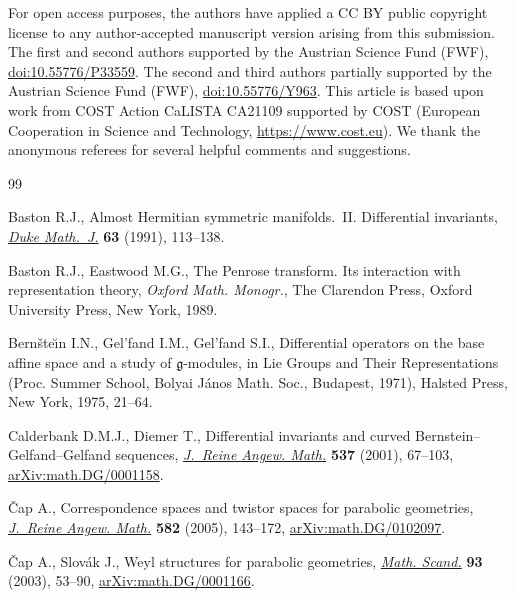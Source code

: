 \documentclass[pdftex]{sigma}
\numberwithin{equation}{section}
\begin{document}
For open access purposes, the authors have applied a CC
BY public copyright license to any author-accepted manuscript version arising from
this submission. The first and second authors supported by the Austrian Science Fund (FWF), \href{https://doi.org/10.55776/P33559}{doi:10.55776/P33559}. The second and third authors partially supported by the Austrian Science
Fund (FWF), \href{https://doi.org/10.55776/Y963}{doi:10.55776/Y963}. This article is based upon work from COST Action CaLISTA CA21109
supported by COST (European Cooperation in Science and
Technology, \url{https://www.cost.eu}).
We thank the anonymous referees for several helpful comments and suggestions.


\begin{thebibliography}{99}
\footnotesize\itemsep=0pt

Baston R.J., Almost {H}ermitian symmetric manifolds.~{II}. {D}ifferential
 invariants, \href{https://doi.org/10.1215/S0012-7094-91-06306-4}{\textit{Duke Math.~J.}} \textbf{63} (1991), 113--138.

Baston R.J., Eastwood M.G., The {P}enrose transform. Its interaction with
 representation theory, \textit{Oxford Math. Monogr.}, The Clarendon Press, Oxford
 University Press, New York, 1989.

Bern\v{s}te\u{\i}n I.N., Gel'fand I.M., Gel'fand S.I., Differential operators
 on the base affine space and a study of {$\mathfrak{g}$}-modules, in Lie
 Groups and Their Representations ({P}roc. {S}ummer {S}chool, {B}olyai
 {J}\'anos {M}ath. {S}oc., {B}udapest, 1971), Halsted Press, New York, 1975,
 21--64.

Calderbank D.M.J., Diemer T., Differential invariants and curved
 {B}ernstein--{G}elfand--{G}elfand sequences, \href{https://doi.org/10.1515/crll.2001.059}{\textit{J.~Reine Angew. Math.}}
 \textbf{537} (2001), 67--103, \href{https://arxiv.org/abs/math.DG/0001158}{arXiv:math.DG/0001158}.

{\v{C}}ap A., Correspondence spaces and twistor spaces for parabolic
 geometries, \href{https://doi.org/10.1515/crll.2005.2005.582.143}{\textit{J.~Reine Angew. Math.}} \textbf{582} (2005), 143--172,
 \href{https://arxiv.org/abs/math.DG/0102097}{arXiv:math.DG/0102097}.

{\v{C}}ap A., Slov\'ak J., Weyl structures for parabolic geometries,
 \href{https://doi.org/10.7146/math.scand.a-14413}{\textit{Math. Scand.}} \textbf{93} (2003), 53--90, \href{https://arxiv.org/abs/math.DG/0001166}{arXiv:math.DG/0001166}.


\end{thebibliography}
\end{document}
